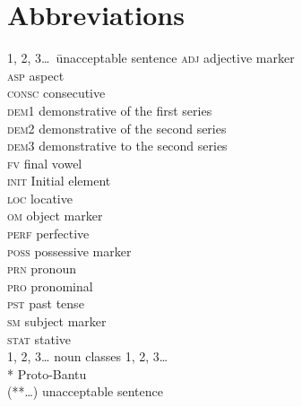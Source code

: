 \documentclass[output=paper]{langscibook}
\begin{document}
\newpage
\section*{Abbreviations}
\setlength{\columnsep}{2cm}
\begin{multicols}{2}
\begin{tabbing}
1, 2, 3\ldots\, \=   unacceptable sentence\kill
\textsc{adj} \>               adjective marker\\
\textsc{asp} \>             aspect\\
\textsc{consc} \>       consecutive\\
\textsc{dem1} \>           demonstrative of the first series\\
\textsc{dem2} \>           demonstrative of the second series\\
\textsc{dem3} \>            demonstrative to the second series\\
\textsc{fv} \>               final vowel\\
\textsc{init} \>            Initial element\\
\textsc{loc} \>            locative\\
\textsc{om} \>               object marker\\
\textsc{perf} \>           perfective\\
\textsc{poss} \>           possessive marker\\
\textsc{prn} \>             pronoun\\
\textsc{pro} \>             pronominal\\
\textsc{pst} \>             past tense\\
\textsc{sm} \>              subject marker\\
\textsc{stat} \>           stative\\
1, 2, 3\ldots \>         noun classes 1, 2, 3\ldots\\
*  \>        Proto-Bantu\\
(**…) \>                 unacceptable sentence
\end{tabbing}
\end{multicols}

\sloppy\printbibliography[heading=subbibliography,notkeyword=this]
\end{document}
